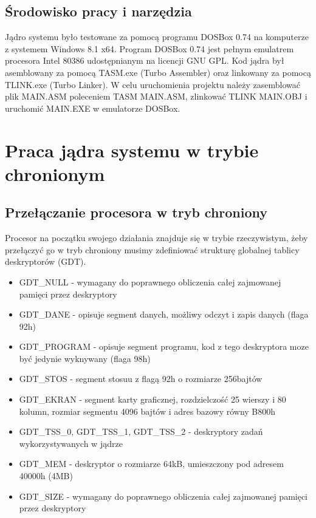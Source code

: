 \documentclass[a4paper,12pt]{article}
\begin{document}
	\subsection{Środowisko pracy i narzędzia}
	Jądro systemu było testowane za pomocą programu DOSBox 0.74 na komputerze z systemem Windows 8.1 x64. Program DOSBox 0.74 jest pełnym emulatrem procesora Intel 80386 udostępnianym na licencji GNU GPL. Kod jądra był asemblowany za pomocą TASM.exe (Turbo Assembler) oraz linkowany za pomocą TLINK.exe (Turbo Linker). W celu uruchomienia projektu należy zasemblować plik MAIN.ASM poleceniem TASM MAIN.ASM, zlinkować TLINK MAIN.OBJ i uruchomić MAIN.EXE w emulatorze DOSBox. 

	\section{Praca jądra systemu w trybie chronionym}


	\subsection{Przełączanie procesora w tryb chroniony}
Procesor na początku swojego działania znajduje się w trybie rzeczywistym, żeby przełączyć go w tryb chroniony musimy zdefiniować strukturę globalnej tablicy deskryptorów (GDT).

\begin{itemize}
\item{GDT\_NULL - wymagany do poprawnego obliczenia całej zajmowanej pamięci przez deskryptory}
\item{GDT\_DANE - opisuje segment danych, możliwy odczyt i zapis danych (flaga 92h)}
\item{GDT\_PROGRAM - opisuje segment programu, kod z tego deskryptora moze być jedynie wyknywany (flaga 98h)}
\item{GDT\_STOS - segment stosuu z flagą 92h o rozmiarze 256bajtów}
\item{GDT\_EKRAN - segment karty graficznej, rozdzielczość 25 wierszy i 80 kolumn, rozmiar segmentu 4096 bajtów i adres bazowy równy B800h}
\item{GDT\_TSS\_0, GDT\_TSS\_1, GDT\_TSS\_2 -  deskryptory zadań wykorzystywanych w jądrze}
\item{GDT\_MEM - deskryptor o rozmiarze 64kB, umieszczony pod adresem 40000h (4MB)}
\item{GDT\_SIZE - wymagany do poprawnego obliczenia całej zajmowanej pamięci przez deskryptory}

\end{itemize}
\end{document}
